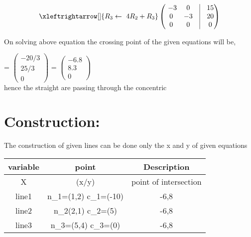 \documentclass[journal,12pt,twocolumn]{article}
\let\vec\mathbf
\newcommand{\myvec}[1]{\ensuremath{\begin{pmatrix}#1\end{pmatrix}}}
\begin{document}
\begin{align}
 \xleftrightarrow[]{R_3 \leftarrow \ 4R_2+R_3}
		\myvec{
    \ -3 & 0 & \vrule & 15
			    \\
0 & -3  &\vrule & 20
\\
0 & 0  &\vrule & 0
		    }
\end{align}


\begin{flushleft}
On solving above equation the crossing point of the given equations will be,\\
\end{flushleft}
\vec{X}= \myvec{-20/3\\25/3\\0}
\endcenter
\vec{X}= \myvec{-6.8\\8.3\\0}
  \\hence the straight are passing through the concentric
  \vspace{10mm}
\section{Construction:}
The construction of given lines can be done only the x and y of given equations
\begin{table}[h]
 \centering
\setlength\extrarowheight{2pt}
 \begin{tabular}{|c|c|c|}
  \hline
  \textbf{variable} & \textbf{point} & \textbf{Description}\\
  \hline
  X & (x/y) & point of intersection \\
  
  \hline
  line1 & n_1=(1,2) c_1=(-10) & -6,8\\
  \hline                   
  line2 & n_2(2,1) c_2=(5) & -6,8\\
  \hline
  line3 & n_3=(5,4) c_3=(0)& -6,8\\
  
  \hline
 \end{tabular}
\end{table}
\end{document}
